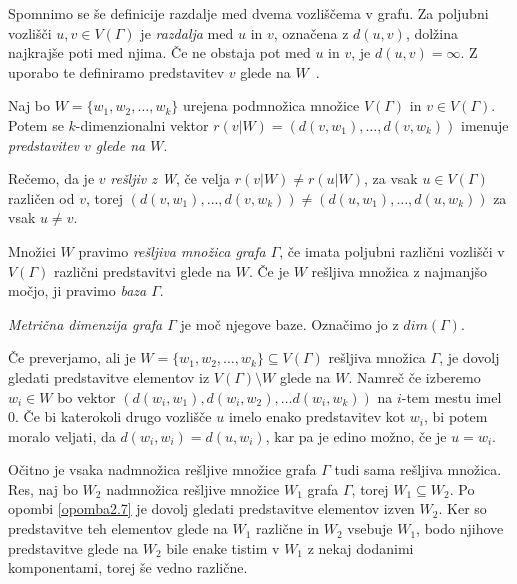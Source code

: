 \documentclass[mat1, tisk]{fmfdelo}
\begin{document}
%
Spomnimo se še definicije razdalje med dvema vozliščema v grafu. Za poljubni vozlišči 
$u,v \in V(\Gamma)$ je \emph{razdalja} med $u$ in $v$, označena z $d(u,v)$, dolžina 
najkrajše poti med njima. Če ne obstaja pot med $u$ in $v$, je $d(u,v) = \infty $.
Z uporabo te definiramo predstavitev $v$ glede na $W$~\cite{7dolzan}.
%
\begin{definicija}
  Naj bo $W = \{ w_1,w_2, \ldots, w_k \}$ urejena podmnožica množice $V(\Gamma)$ in 
  $v \in V(\Gamma)$. Potem 
  se $k$-dimenzionalni vektor $r(v|W)=( d(v,w_1), \ldots, d(v,w_k) )$ imenuje 
  \emph{predstavitev $v$ glede na $W$}. 

  Rečemo, da je $v$ \emph{rešljiv z W}, če velja $r(v|W) \neq r(u|W)$, 
  za vsak $u \in V(\Gamma)$ različen od $v$, torej 
  $( d(v,w_1), \ldots, d(v,w_k) ) \neq ( d(u,w_1), \ldots, d(u,w_k) )$ za vsak 
  $u \neq v$.
\end{definicija}
%
Množici $W$ pravimo \emph{rešljiva množica grafa $\Gamma$}, če imata poljubni različni 
vozlišči v $V(\Gamma)$ različni predstavitvi glede na $W$. Če je $W$ rešljiva množica 
z najmanjšo močjo, ji pravimo \emph{baza $\Gamma$}.
%
\begin{definicija}
  \emph{Metrična dimenzija grafa $\Gamma$} je moč njegove baze. Označimo jo z $dim(\Gamma)$.
\end{definicija}
%
\begin{opomba}\label{opomba2.7}
  Če preverjamo, ali je $W= \{w_1,w_2, \ldots, w_k\} \subseteq V(\Gamma)$ 
  rešljiva množica $\Gamma$, je dovolj gledati predstavitve elementov iz 
  $V(\Gamma) \setminus W$ glede na $W$. Namreč če izberemo $w_i \in W$ bo vektor 
  $(d(w_i,w_1),d(w_i,w_2), \ldots d(w_i,w_k))$ na $i$-tem mestu imel 0. 
  Če bi katerokoli drugo vozlišče $u$ imelo enako predstavitev kot $w_i$, bi 
  potem moralo veljati, da $d(w_i,w_i) = d(u,w_i)$, kar pa je edino možno, 
  če je $u = w_i$.
\end{opomba}
%
\begin{opomba}\label{opomba2.8}
  Očitno je vsaka nadmnožica rešljive množice grafa $\Gamma$ tudi sama rešljiva 
  množica. Res, naj bo $W_2$ nadmnožica rešljive množice $W_1$ grafa $\Gamma$, 
  torej $W_1 \subseteq W_2$. Po opombi \ref{opomba2.7} je dovolj gledati 
  predstavitve elementov izven $W_2$. Ker so predstavitve teh elementov glede na 
  $W_1$ različne in $W_2$ vsebuje $W_1$, bodo njihove predstavitve glede na 
  $W_2$ bile enake tistim v $W_1$ z nekaj dodanimi komponentami, torej še vedno 
  različne.
\end{opomba}
\end{document}
